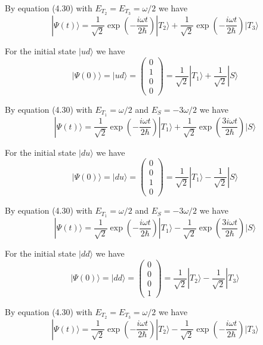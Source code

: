 \documentclass[12pt]{article}
\begin{document}
By equation (4.30) with $E_{T_2}=E_{T_3}=\omega/2$ we have
\begin{equation*}
|\Psi(t)\rangle=\frac{1}{\sqrt2}\exp\left(-\frac{i\omega t}{2\hbar}\right)|T_2\rangle
+\frac{1}{\sqrt2}\exp\left(-\frac{i\omega t}{2\hbar}\right)|T_3\rangle
\end{equation*}

For the initial state $|ud\rangle$ we have
\begin{equation*}
|\Psi(0)\rangle=|ud\rangle=\begin{pmatrix}0\\1\\0\\0\end{pmatrix}
=\frac{1}{\sqrt2}|T_1\rangle+\frac{1}{\sqrt2}|S\rangle
\end{equation*}

By equation (4.30) with $E_{T_1}=\omega/2$ and $E_S=-3\omega/2$ we have
\begin{equation*}
|\Psi(t)\rangle=\frac{1}{\sqrt2}\exp\left(-\frac{i\omega t}{2\hbar}\right)|T_1\rangle
+\frac{1}{\sqrt2}\exp\left(\frac{3i\omega t}{2\hbar}\right)|S\rangle
\end{equation*}

For the initial state $|du\rangle$ we have
\begin{equation*}
|\Psi(0)\rangle=|du\rangle=\begin{pmatrix}0\\0\\1\\0\end{pmatrix}
=\frac{1}{\sqrt2}|T_1\rangle-\frac{1}{\sqrt2}|S\rangle
\end{equation*}

By equation (4.30) with $E_{T_1}=\omega/2$ and $E_S=-3\omega/2$ we have
\begin{equation*}
|\Psi(t)\rangle=\frac{1}{\sqrt2}\exp\left(-\frac{i\omega t}{2\hbar}\right)|T_1\rangle
-\frac{1}{\sqrt2}\exp\left(\frac{3i\omega t}{2\hbar}\right)|S\rangle
\end{equation*}

For the initial state $|dd\rangle$ we have
\begin{equation*}
|\Psi(0)\rangle=|dd\rangle=\begin{pmatrix}0\\0\\0\\1\end{pmatrix}
=\frac{1}{\sqrt2}|T_2\rangle-\frac{1}{\sqrt2}|T_3\rangle
\end{equation*}

By equation (4.30) with $E_{T_2}=E_{T_3}=\omega/2$ we have
\begin{equation*}
|\Psi(t)\rangle=\frac{1}{\sqrt2}\exp\left(-\frac{i\omega t}{2\hbar}\right)|T_2\rangle
-\frac{1}{\sqrt2}\exp\left(-\frac{i\omega t}{2\hbar}\right)|T_3\rangle
\end{equation*}
\end{document}
